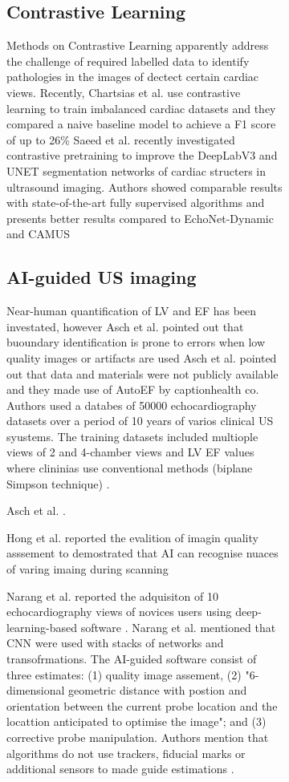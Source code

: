 \begin{figure}[H]
\begin{figure}[H]
\subsection{Contrastive Learning}
Methods on Contrastive Learning apparently address the challenge of required labelled data to identify pathologies in the images of dectect certain cardiac views.
Recently, Chartsias et al. use contrastive learning to train imbalanced cardiac datasets and they compared a naive baseline model to achieve a F1 score of up to 26\% \cite{chartsias2021-ASMUS}
Saeed et al. recently investigated contrastive pretraining to improve the DeepLabV3 and UNET segmentation networks of cardiac structers in ultrasound imaging.
Authors showed comparable results with state-of-the-art fully supervised algorithms and presents better results compared to EchoNet-Dynamic and CAMUS \cite{saeed2021MIDL}





\subsection{AI-guided US imaging}

Near-human quantification of LV and EF has been investated, however Asch et al. pointed out that buoundary identification is prone to errors when low quality images or artifacts are used
Asch et al. pointed out that data and materials were not publicly available and they made use of AutoEF by captionhealth co.
Authors used a databes of 50000 echocardiography datasets over a period of 10 years of varios clinical US syustems. 
The training datasets included multiople views of 2 and 4-chamber views and LV EF values where clininias use conventional methods (biplane Simpson technique) \cite{asch2019CIRIMAGING}.

Asch et al. \cite{asch2021CircImaging}.

Hong et al. reported the evalition of imagin quality asssement to demostrated that AI can recognise nuaces of varing imaing during scanning \cite{hong2021JACC}


Narang et al. reported the adquisiton of 10 echocardiography views of novices users using deep-learning-based software \cite{Narang2021JAMACARDIOLOGY}.
Narang et al. mentioned that CNN were used with stacks of networks and transofrmations. 
The AI-guided software consist of three estimates: (1) quality image assement, (2) "6-dimensional geometric distance with postion and orientation between the current probe location and the locattion anticipated to optimise the image"; and (3) corrective probe manipulation. \cite{Narang2021JAMACARDIOLOGY}
Authors mention that algorithms do not use trackers, fiducial marks or additional sensors to made guide estimations \cite{Narang2021JAMACARDIOLOGY}.



\end{figure}
\end{figure}
